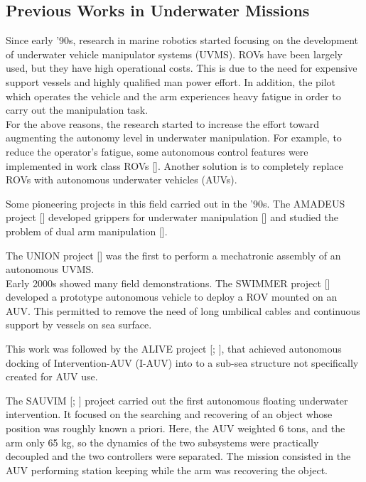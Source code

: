 \subsection{Previous Works in Underwater Missions}
Since early '90s, research in marine robotics started focusing on the development of underwater vehicle manipulator systems (UVMS). ROVs have been largely used, but they have high operational costs. This is due to the need for expensive support vessels and highly qualified man power effort. In addition, the pilot which operates the vehicle and the arm experiences heavy fatigue in order to carry out the manipulation task.\\


For the above reasons, the research started to increase the effort toward augmenting the autonomy level in underwater manipulation. For example, to reduce the operator's fatigue, some autonomous control features were implemented in work class ROVs [\cite{IntroTeleopRov}]. Another solution is to completely replace ROVs with autonomous underwater vehicles (AUVs).

Some pioneering projects in this field carried out in the '90s. The AMADEUS project [\cite{IntroAMADEUS1}] developed grippers for underwater manipulation [\cite{IntroAMADEUS2}] and studied the problem of dual arm manipulation [\cite{IntroAMADEUS3}].

The UNION project [\cite{IntroUNION}] was the first to perform a mechatronic assembly of an autonomous UVMS.\\


Early 2000s showed many field demonstrations. The SWIMMER project [\cite{IntroSwimmer1}] developed a prototype autonomous vehicle to deploy a ROV mounted on an AUV. This permitted to remove the need of long umbilical cables and continuous support by vessels on sea surface.

This work was followed by the ALIVE project [\cite{IntroAlive1}; \cite{IntroAlive2}], that achieved autonomous docking of Intervention-AUV (I-AUV) into to a sub-sea structure not specifically created for AUV use.

The SAUVIM [\cite{IntroSauvim1}; \cite{IntroSauvim2}] project carried out the first autonomous floating underwater intervention. It focused on the searching and recovering of an object whose position was roughly known a priori. Here, the AUV weighted 6 tons, and the arm only 65 kg, so the dynamics of the two subsystems were practically decoupled and the two controllers were separated. The mission consisted in the AUV performing station keeping while the arm was recovering the object.

